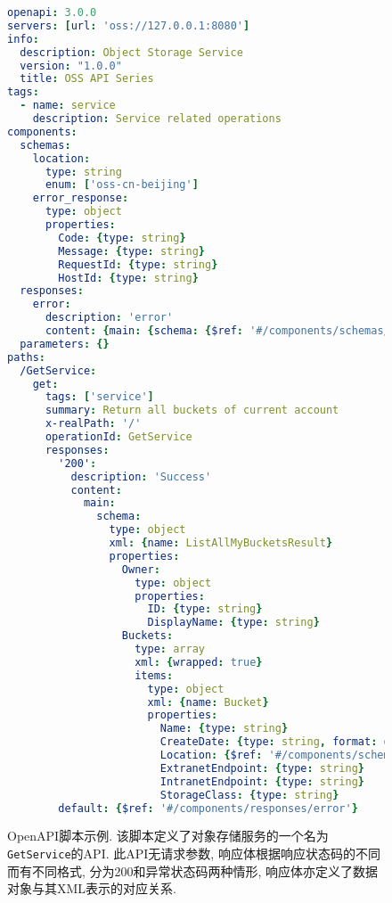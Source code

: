         \begin{figure}[!htb]
            \centering
            \scriptsize
            \tt
            
                \begin{lstlisting}[language=yaml]
openapi: 3.0.0
servers: [url: 'oss://127.0.0.1:8080']
info:
  description: Object Storage Service
  version: "1.0.0"
  title: OSS API Series
tags:
  - name: service
    description: Service related operations
components:
  schemas:
    location:
      type: string
      enum: ['oss-cn-beijing']
    error_response:
      type: object
      properties:
        Code: {type: string}
        Message: {type: string}
        RequestId: {type: string}
        HostId: {type: string}
  responses:
    error:
      description: 'error'
      content: {main: {schema: {$ref: '#/components/schemas/error_response'}}}
  parameters: {}
paths:
  /GetService:
    get:
      tags: ['service']
      summary: Return all buckets of current account
      x-realPath: '/'
      operationId: GetService
      responses:
        '200':
          description: 'Success'
          content:
            main:
              schema:
                type: object
                xml: {name: ListAllMyBucketsResult}
                properties:
                  Owner:
                    type: object
                    properties:
                      ID: {type: string}
                      DisplayName: {type: string}
                  Buckets:
                    type: array
                    xml: {wrapped: true}
                    items:
                      type: object
                      xml: {name: Bucket}
                      properties:
                        Name: {type: string}
                        CreateDate: {type: string, format: date-time}
                        Location: {$ref: '#/components/schemas/location'}
                        ExtranetEndpoint: {type: string}
                        IntranetEndpoint: {type: string}
                        StorageClass: {type: string}
        default: {$ref: '#/components/responses/error'}
                \end{lstlisting}
            
            \caption[OpenAPI脚本示例]{OpenAPI脚本示例. 该脚本定义了对象存储服务的一个名为\texttt{GetService}的API. 此API无请求参数, 响应体根据响应状态码的不同而有不同格式, 分为200和异常状态码两种情形, 响应体亦定义了数据对象与其XML表示的对应关系.}
            \label{fig:openapi_example}
        \end{figure}
        
